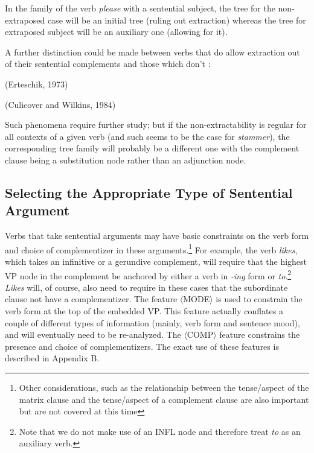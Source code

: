 \beginsentences
{}
\endsentences

In the family of the verb {\it please} with a sentential subject, the tree for 
the non-extraposed case will be an initial tree (ruling out extraction) whereas the tree for extraposed subject will be an auxiliary one (allowing for it).


A further distinction could be made between verbs that do allow extraction out of their sentential complements
and those which don't :

\beginsentences
{}
\endsentences

\beginsentences
{}
 (Erteschik, 1973)\nocite{ert71}
\endsentences

\beginsentences
{}
 (Culicover and Wilkins, 1984)\nocite{culicover-wilkins}
\endsentences

Such phenomena require further study; but if the non-extractability is regular for all contexts of a given verb
(and such seems to be the case for {\it stammer}), the corresponding tree family will
probably be a different one  with the complement clause being a substitution node rather than
an adjunction node.

\subsection{Selecting the Appropriate Type of Sentential Argument}

Verbs that take sentential arguments may have basic constraints on the verb form and choice 
of complementizer in these arguments.\footnote{Other considerations, such as the relationship
between the tense/aspect of the matrix clause and the tense/aspect of a complement clause are
also important but are not covered at this time}  For example, the verb {\it likes}, 
which takes an infinitive or a gerundive complement, will require that the highest VP node in 
the complement be anchored by either a verb in {\it -ing} form or 
{\it to}.\footnote{Note that we do not make use of an INFL node and therefore 
treat {\it to} as an auxiliary verb.} {\it Likes} will, of course,  also need to require
in these cases that the subordinate clause not have a complementizer.  The feature $\langle$MODE$\rangle$ 
is used to constrain the verb form at the top of the embedded VP. This feature actually 
conflates a couple of different types of information (mainly, verb form and sentence mood),
and will eventually need to be re-analyzed. The $\langle$COMP$\rangle$ feature constrains the 
presence and choice of complementizers. The exact use of these features is described in 
Appendix B.

